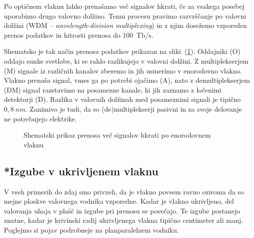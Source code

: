 \begin{remark}
Po optičnem vlaknu lahko prenašamo več signalov hkrati, če za vsakega posebej uporabimo
drugo valovno dolžino. Temu procesu pravimo razvrščanje po valovni dolžini
(WDM -- {\it wavelength-division multiplexing})
 in z njim dosežemo vzporeden prenos podatkov in hitrosti prenosa do 100~Tb/s.
 
Shematsko je tak način prenosa podatkov prikazan na sliki~(\ref{WDM}).
Oddajniki (O) oddajo sunke svetlobe, ki se rahlo razlikujejo v valovni dolžini. 
Z multiplekserjem (M) signale iz različnih kanalov zberemo in jih usmerimo v 
enorodovno vlakno. Vlakno prenaša signal, vmes ga po potrebi ojačimo (A), 
nato z demultiplekserjem (DM) signal razstavimo na posamezne kanale, ki jih 
zaznamo z ločenimi detektorji (D). Razlika v valovnih dolžinah med posameznimi signali 
je tipično $0,8~\si{nm}$. Zanimivo je tudi, da so (de)multiplekserji pasivni in za 
svoje delovanje ne potrebujejo elektrike.
\begin{figure}[h]
\centering
\def\svgwidth{120truemm} 
 
\caption{Shematski prikaz prenosa več signalov hkrati po enorodovnem vlaknu}
\label{WDM}
\end{figure}
\end{remark}
\subsection*{*Izgube v ukrivljenem vlaknu}
V vseh primerih do zdaj smo privzeli, da je vlakno povsem ravno 
oziroma da so mejne ploskve valovnega vodnika vzporedne. 
Kadar je vlakno ukrivljeno, del valovanja uhaja v plašč in 
izgube pri prenosu se povečajo. Te izgube postanejo znatne, 
kadar je krivinski radij ukrivljenega vlakna tipično centimeter ali manj. 
Poglejmo si pojav podrobneje na planparalelnem vodniku.

